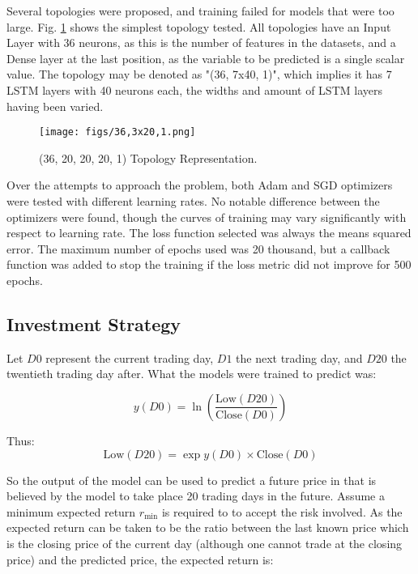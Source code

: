\documentclass[conference]{IEEEtran}
\begin{document}
Several topologies were proposed, and training failed for models that were too large. Fig. \ref{fig:3x20_topology} shows the simplest topology tested. All topologies have an Input Layer with 36 neurons, as this is the number of features in the datasets, and a Dense layer at the last position, as the variable to be predicted is a single scalar value. The topology may be denoted as "(36, 7x40, 1)", which implies it has 7 LSTM layers with 40 neurons each, the widths and amount of LSTM layers having been varied.

\begin{figure}[htbp]
    \centerline{\texttt{[image: figs/36,3x20,1.png]}}
    \caption{(36, 20, 20, 20, 1) Topology Representation.}
    \label{fig:3x20_topology}
\end{figure}

Over the attempts to approach the problem, both Adam and SGD optimizers were tested with different learning rates. No notable difference between the optimizers were found, though the curves of training may vary significantly with respect to learning rate. The loss function selected was always the means squared error. The maximum number of epochs used was 20 thousand, but a callback function was added to stop the training if the loss metric did not improve for 500 epochs.

\subsection{Investment Strategy}
Let $D0$ represent the current trading day, $D1$ the next trading day, and $D20$ the twentieth trading day after. What the models were trained to predict was:

\begin{equation}
    y(D0) = \ln \left( \frac{\text{Low}(D20)}{\text{Close}(D0)} \right)
\end{equation}

Thus:
\begin{equation}
    \text{Low}(D20) = \exp{y(D0)} \times \text{Close}(D0)
\end{equation}

So the output of the model can be used to predict a future price in that is believed by the model to take place 20 trading days in the future. Assume a minimum expected return $r_{\text{min}}$ is required to to accept the risk involved. As the expected return can be taken to be the ratio between the last known price which is the closing price of the current day (although one cannot trade at the closing price) and the predicted price, the expected return is:
\end{document}
